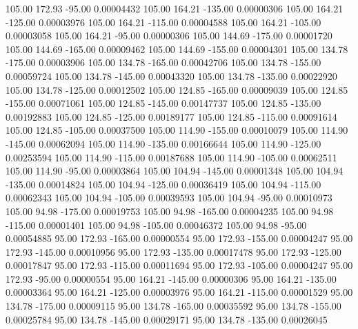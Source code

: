     105.00    172.93    -95.00     0.00004432
    105.00    164.21   -135.00     0.00000306
    105.00    164.21   -125.00     0.00003976
    105.00    164.21   -115.00     0.00004588
    105.00    164.21   -105.00     0.00003058
    105.00    164.21    -95.00     0.00000306
    105.00    144.69   -175.00     0.00001720
    105.00    144.69   -165.00     0.00009462
    105.00    144.69   -155.00     0.00004301
    105.00    134.78   -175.00     0.00003906
    105.00    134.78   -165.00     0.00042706
    105.00    134.78   -155.00     0.00059724
    105.00    134.78   -145.00     0.00043320
    105.00    134.78   -135.00     0.00022920
    105.00    134.78   -125.00     0.00012502
    105.00    124.85   -165.00     0.00009039
    105.00    124.85   -155.00     0.00071061
    105.00    124.85   -145.00     0.00147737
    105.00    124.85   -135.00     0.00192883
    105.00    124.85   -125.00     0.00189177
    105.00    124.85   -115.00     0.00091614
    105.00    124.85   -105.00     0.00037500
    105.00    114.90   -155.00     0.00010079
    105.00    114.90   -145.00     0.00062094
    105.00    114.90   -135.00     0.00166644
    105.00    114.90   -125.00     0.00253594
    105.00    114.90   -115.00     0.00187688
    105.00    114.90   -105.00     0.00062511
    105.00    114.90    -95.00     0.00003864
    105.00    104.94   -145.00     0.00001348
    105.00    104.94   -135.00     0.00014824
    105.00    104.94   -125.00     0.00036419
    105.00    104.94   -115.00     0.00062343
    105.00    104.94   -105.00     0.00039593
    105.00    104.94    -95.00     0.00010973
    105.00     94.98   -175.00     0.00019753
    105.00     94.98   -165.00     0.00004235
    105.00     94.98   -115.00     0.00001401
    105.00     94.98   -105.00     0.00046372
    105.00     94.98    -95.00     0.00054885
     95.00    172.93   -165.00     0.00000554
     95.00    172.93   -155.00     0.00004247
     95.00    172.93   -145.00     0.00010956
     95.00    172.93   -135.00     0.00017478
     95.00    172.93   -125.00     0.00017847
     95.00    172.93   -115.00     0.00011694
     95.00    172.93   -105.00     0.00004247
     95.00    172.93    -95.00     0.00000554
     95.00    164.21   -145.00     0.00000306
     95.00    164.21   -135.00     0.00003364
     95.00    164.21   -125.00     0.00003976
     95.00    164.21   -115.00     0.00001529
     95.00    134.78   -175.00     0.00009115
     95.00    134.78   -165.00     0.00035592
     95.00    134.78   -155.00     0.00025784
     95.00    134.78   -145.00     0.00029171
     95.00    134.78   -135.00     0.00026045

